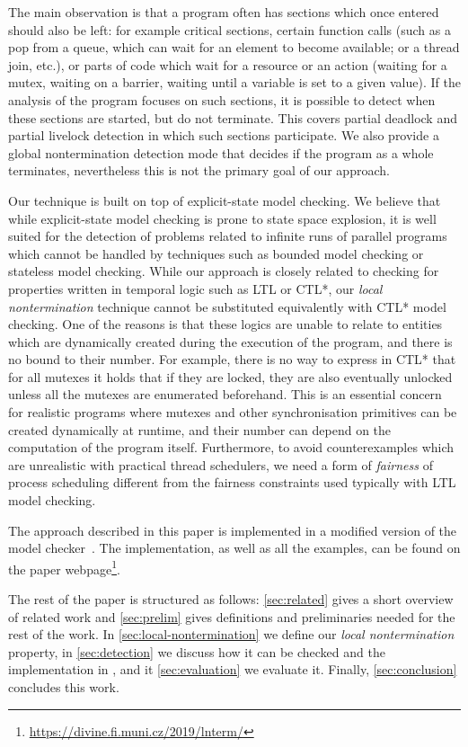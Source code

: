 The main observation is that a program often has sections which once entered
should also be left: for example critical sections, certain function calls (such
as a pop from a queue, which can wait for an element to become available; or a
thread join, etc.), or parts of code which wait for a resource or an action (waiting for a mutex, waiting on a barrier, waiting until a variable is set to a given value).
If the analysis of the program focuses on such sections, it is possible to
detect when these sections are started, but do not terminate.
This covers partial deadlock and partial livelock detection in which such sections participate.
We also provide a global nontermination detection mode that decides if the
program as a whole terminates, nevertheless this is not the primary goal of our approach.

Our technique is built on top of explicit-state model checking.  We believe that while explicit-state model checking is prone to state space explosion, it is well suited for the detection of problems related to infinite runs of parallel programs which cannot be handled by techniques such as bounded model checking or stateless model checking.
While our approach is closely related to checking for properties written in temporal logic such as LTL or CTL*, our \emph{local nontermination} technique cannot be substituted equivalently with CTL* model checking.
One of the reasons is that these logics are unable to relate to entities which are dynamically created during the execution of the program, and there is no bound to their number.
For example, there is no way to express in CTL* that for all mutexes it holds that if they are locked, they are also eventually unlocked unless all the mutexes are enumerated beforehand.
This is an essential concern for realistic programs where mutexes and other synchronisation primitives can be created dynamically at runtime, and their number can depend on the computation of the program itself.
Furthermore, to avoid counterexamples which are unrealistic with practical
thread schedulers, we need a form of \emph{fairness} of process scheduling
different from the fairness constraints used typically with LTL model checking.


The approach described in this paper is implemented in a modified version of the \divine model checker~\cite{BBK+17,RSCB2018}.
The implementation, as well as all the examples, can be found on the paper webpage\footnote{\url{https://divine.fi.muni.cz/2019/lnterm/}}.

The rest of the paper is structured as follows: \autoref{sec:related} gives a short
overview of related work and \autoref{sec:prelim} gives definitions and preliminaries needed for the rest of the work.
In \autoref{sec:local-nontermination} we define our \emph{local nontermination} property, in \autoref{sec:detection} we discuss how it can be checked and the implementation in \divine, and it \autoref{sec:evaluation} we evaluate it.
Finally, \autoref{sec:conclusion} concludes this work.

